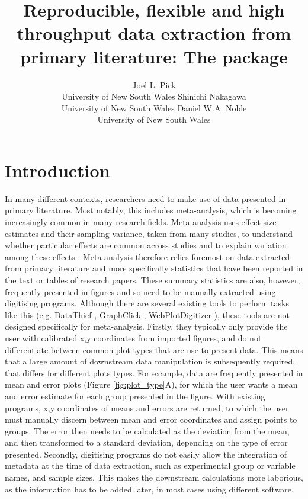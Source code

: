 \documentclass[article]{jss}
\author{Joel L. Pick\\University of New South Wales
   \And Shinichi Nakagawa\\University of New South Wales
   \AND Daniel W.A. Noble\\University of New South Wales
   }
\title{Reproducible, flexible and high throughput data extraction from primary literature: The \pkg{metaDigitise} \proglang{R} package}
\begin{document}



\section{Introduction}

In many different contexts, researchers need to make use of data presented in primary literature. Most notably, this includes meta-analysis, which is becoming increasingly common in many research fields. Meta-analysis uses effect size estimates and their sampling variance, taken from many studies, to understand whether particular effects are common across studies and to explain variation among these effects \citep{Naka2017, Glass1976, Koricheva2013, Borenstein2009}. Meta-analysis therefore relies foremost on data extracted from primary literature and more specifically statistics that have been reported in the text or tables of research papers. These summary statistics are also, however, frequently presented in figures and so need to be manually extracted using digitising programs. Although there are several existing tools to perform tasks like this (e.g. DataThief \citep{DataThief}, GraphClick \citep{GraphClick}, WebPlotDigitizer \citep{WebPlotDigitizer}), these tools are not designed specifically for meta-analysis. 
Firstly, they typically only provide the user with calibrated x,y coordinates from imported figures, and do not differentiate between common plot types that are use to present data. This means that a large amount of downstream data manipulation is subsequently required, that differs for different plots types. For example, data are frequently presented in mean and error plots (Figure \ref{fig:plot_type}A), for which the user wants a mean and error estimate for each group presented in the figure. With existing programs, x,y coordinates of means and errors are returned, to which the user must manually discern between mean and error coordinates and assign points to groups. The error then needs to be calculated as the deviation from the mean, and then transformed to a standard deviation, depending on the type of error presented.
Secondly, digitising programs do not easily allow the integration of metadata at the time of data extraction, such as experimental group or variable names, and sample sizes. This makes the downstream calculations more laborious, as the information has to be added later, in most cases using different software.
\end{document}
